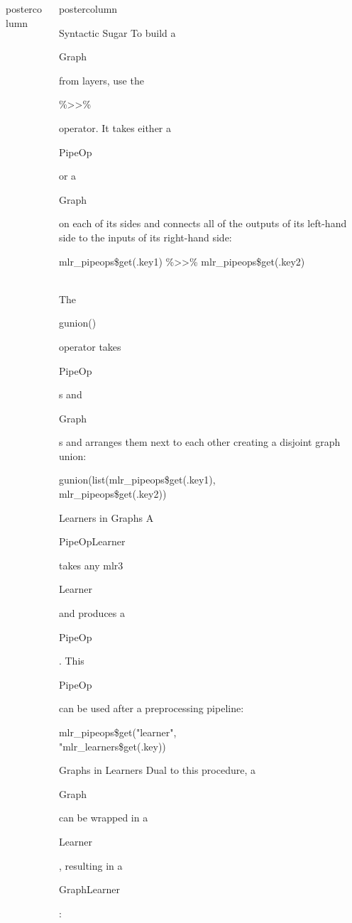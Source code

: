\documentclass{beamer}
\newlength{\columnheight} %
\newcommand{\codeinline}[1]{\begin{codeboxinline}#1\end{codeboxinline}}
\begin{document}
\begin{frame}[fragile]{}
\begin{columns}
\begin{column}{.245\textwidth}
\begin{beamercolorbox}[center]{postercolumn}
\begin{minipage}{.98\textwidth}
{						\vfill}
				\end{minipage}
			\end{beamercolorbox}
		\end{column}
		\begin{column}{.245\textwidth}
			\begin{beamercolorbox}[center]{postercolumn}
				\begin{minipage}{.98\textwidth}
					\parbox[t][\columnheight]{\textwidth}{
            \begin{myblock}{Syntactic Sugar}
              To build a \codeinline{Graph} from layers, use the \codeinline{\%>>\%} operator. It takes either a \codeinline{PipeOp} or a \codeinline{Graph} on each of its sides and connects all of the outputs of its left-hand side to the inputs of its right-hand side:
              \begin{codeboxmultiline}[width=18cm]
                mlr\_pipeops\$get(.key1) \%>>\%
                \hspace*{1ex}mlr\_pipeops\$get(.key2)
              \end{codeboxmultiline}
              \ \\
              The \codeinline{gunion()} operator takes \codeinline{PipeOp}s and \codeinline{Graph}s and arranges them next to each other creating a disjoint graph union:
              \begin{codeboxmultiline}[width=22cm]
                gunion(list(mlr\_pipeops\$get(.key1),\\
                \hspace*{1ex}mlr\_pipeops\$get(.key2))
              \end{codeboxmultiline}
						\end{myblock}
						\begin{myblock}{Learners in Graphs}
              A \codeinline{PipeOpLearner} takes any mlr3 \codeinline{Learner} and produces a \codeinline{PipeOp}. This \codeinline{PipeOp} can be used after a preprocessing pipeline:
              \begin{codeboxmultiline}[width=16cm]
                mlr\_pipeops\$get("learner",\\
                \hspace*{1ex}"mlr\_learners\$get(.key))
              \end{codeboxmultiline}
            \end{myblock}
						\begin{myblock}{Graphs in Learners}
              Dual to this procedure, a \codeinline{Graph} can be wrapped in a \codeinline{Learner}, resulting in a \codeinline{GraphLearner}:

\end{myblock}}
\end{minipage}
\end{beamercolorbox}
\end{column}
\end{columns}
\end{frame}
\end{document}
